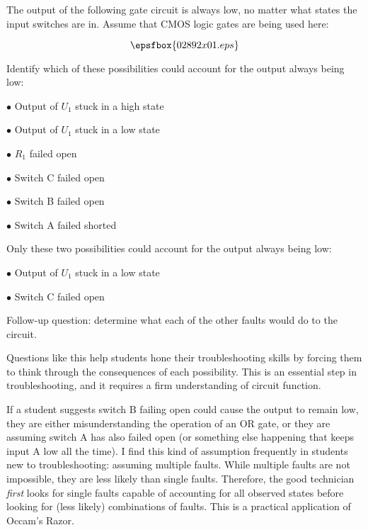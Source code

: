 

The output of the following gate circuit is always low, no matter what states the input switches are in.  Assume that CMOS logic gates are being used here:

$$\epsfbox{02892x01.eps}$$

Identify which of these possibilities could account for the output always being low:

\medskip
\goodbreak
\item{$\bullet$} Output of $U_1$ stuck in a high state
\item{$\bullet$} Output of $U_1$ stuck in a low state
\item{$\bullet$} $R_1$ failed open
\item{$\bullet$} Switch C failed open
\item{$\bullet$} Switch B failed open
\item{$\bullet$} Switch A failed shorted
\medskip







Only these two possibilities could account for the output always being low:

\medskip
\goodbreak
\item{$\bullet$} Output of $U_1$ stuck in a low state
\item{$\bullet$} Switch C failed open
\medskip

\vskip 10pt

Follow-up question: determine what each of the other faults would do to the circuit.







Questions like this help students hone their troubleshooting skills by forcing them to think through the consequences of each possibility.  This is an essential step in troubleshooting, and it requires a firm understanding of circuit function.

If a student suggests switch B failing open could cause the output to remain low, they are either misunderstanding the operation of an OR gate, or they are assuming switch A has also failed open (or something else happening that keeps input A low all the time).  I find this kind of assumption frequently in students new to troubleshooting: assuming multiple faults.  While multiple faults are not impossible, they are less likely than single faults.  Therefore, the good technician {\it first} looks for single faults capable of accounting for all observed states before looking for (less likely) combinations of faults.  This is a practical application of Occam's Razor.




